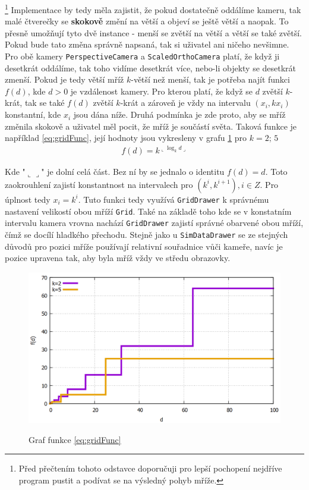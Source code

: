 \footnote{Před přečtením tohoto odstavce doporučuji pro lepší pochopení nejdříve program pustit a podívat se na výsledný pohyb mříže.} Implementace by tedy měla zajistit, že pokud dostatečně oddálíme kameru, tak malé čtverečky se \textbf{skokově} změní na větší a objeví se ještě větší a naopak. To přesně umožňují tyto dvě instance - menší se zvětší na větší a větší se také zvětší. Pokud bude tato změna správně napsaná, tak si uživatel ani ničeho nevšimne. Pro obě kamery \texttt{PerspectiveCamera} a \texttt{ScaledOrthoCamera} platí, že když ji desetkrát oddálíme, tak toho vidíme desetkrát více, nebo-li objekty se desetkrát zmenší. Pokud je tedy větší mříž $ k $-větší než menší, tak je potřeba najít funkci $ f(d) $, kde $ d>0 $ je vzdálenost kamery. Pro kterou platí, že když se $ d $ zvětší $ k$-krát, tak se také $ f(d) $ zvětší $ k $-krát a zároveň je vždy na intervalu $ (x_i,kx_i) $ konstantní, kde $ x_i $ jsou dána níže. Druhá podmínka je zde proto, aby se mříž změnila skokově a uživatel měl pocit, že mříž je součástí světa. Taková funkce je například \ref{eq:gridFunc}, její hodnoty jsou vykresleny v grafu \ref{graf:cameraFunc} pro $ k=2;\,5 $
\begin{align}
\label{eq:gridFunc}
f(d) = k^{\llcorner\log_kd\lrcorner}
\end{align}

Kde "$ \llcorner\lrcorner $" je dolní celá část. Bez ní by se jednalo o identitu $ f(d)=d $. Toto zaokrouhlení zajistí konstantnost na intervalech pro $ (k^i,k^{i+1}) , i\in Z $. Pro úplnost tedy $ x_i=k^i $.
Tuto funkci tedy využívá \texttt{GridDrawer} k správnému nastavení velikostí obou mříží \texttt{Grid}. Také na základě toho kde se v konstatním intervalu kamera vrovna nachází \texttt{GridDrawer} zajistí správné obarvené obou mříží, čímž se docílí hladkého přechodu.
Stejně jako u \texttt{SimDataDrawer} se ze stejných důvodů pro pozici mříže používají relativní souřadnice vůči kameře, navíc je pozice upravena tak, aby byla mříž vždy ve středu obrazovky.
\begin{figure}[h]
	\caption{Graf funkce \ref{eq:gridFunc}}
	\label{graf:cameraFunc}
	\centering
	\includegraphics[width=\linewidth,keepaspectratio]{Figs/plotCameraFnc}\\
\end{figure}
\FloatBarrier
